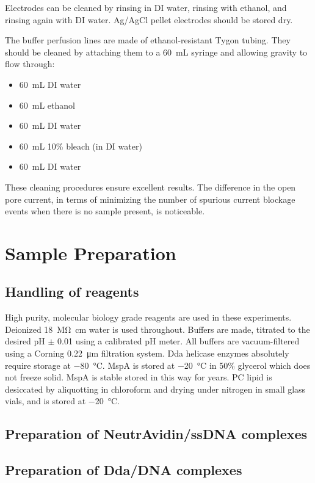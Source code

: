 Electrodes can be cleaned by rinsing in DI water, rinsing with ethanol, and rinsing again with DI water.  Ag/AgCl pellet electrodes should be stored dry.

The buffer perfusion lines are made of ethanol-resistant Tygon tubing.  They should be cleaned by attaching them to a \SI{60}{\mL} syringe and allowing gravity to flow through:

\begin{itemize}
\item \SI{60}{\mL} DI water
\item \SI{60}{\mL} ethanol
\item \SI{60}{\mL} DI water
\item \SI{60}{\mL} \num{10}\% bleach (in DI water)
\item \SI{60}{\mL} DI water
\end{itemize}

These cleaning procedures ensure excellent results.  The difference in the open pore current, in terms of minimizing the number of spurious current blockage events when there is no sample present, is noticeable.

\section{Sample Preparation}
\label{sample_prep}

\subsection{Handling of reagents}

High purity, molecular biology grade reagents are used in these experiments.  Deionized \SI{18}{\mega\ohm\cm} water is used throughout.  Buffers are made, titrated to the desired pH $\pm$ \num{0.01} using a calibrated pH meter.  All buffers are vacuum-filtered using a Corning \SI{0.22}{\micro\m} filtration system.  Dda helicase enzymes absolutely require storage at \SI{-80}{\celsius}.  MspA is stored at \SI{-20}{\celsius} in \num{50}\% glycerol which does not freeze solid.  MspA is stable stored in this way for years.  PC lipid is desiccated by aliquotting in chloroform and drying under nitrogen in small glass vials, and is stored at \SI{-20}{\celsius}.

\subsection{Preparation of NeutrAvidin/ssDNA complexes}



\subsection{Preparation of Dda/DNA complexes}

